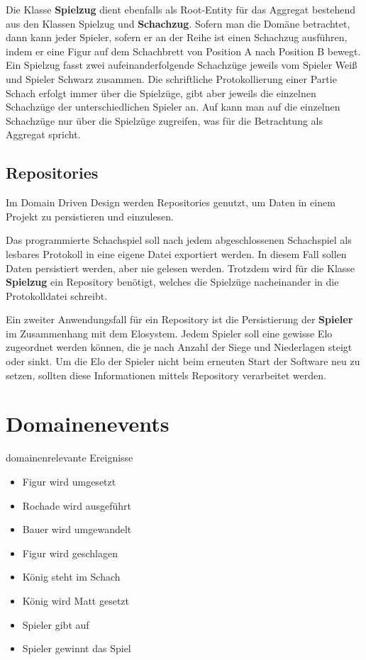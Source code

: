 Die Klasse \textbf{Spielzug} dient ebenfalls als Root-Entity für das Aggregat bestehend aus den Klassen Spielzug und \textbf{Schachzug}.
Sofern man die Domäne betrachtet, dann kann jeder Spieler, sofern er an der Reihe ist einen Schachzug ausführen, indem er eine Figur auf dem Schachbrett von Position A nach Position B bewegt. 
Ein Spielzug fasst zwei aufeinanderfolgende Schachzüge jeweils vom Spieler Weiß und Spieler Schwarz zusammen.
Die schriftliche Protokollierung einer Partie Schach erfolgt immer über die Spielzüge, gibt aber jeweils die einzelnen Schachzüge der unterschiedlichen Spieler an. 
Auf kann man auf die einzelnen Schachzüge nur über die Spielzüge zugreifen, was für die Betrachtung als Aggregat spricht. 

\subsection*{Repositories}

Im Domain Driven Design werden Repositories genutzt, um Daten in einem Projekt zu persistieren und einzulesen. 

Das programmierte Schachspiel soll nach jedem abgeschlossenen Schachspiel als lesbares Protokoll in eine eigene Datei exportiert werden. 
In diesem Fall sollen Daten persistiert werden, aber nie gelesen werden. 
Trotzdem wird für die Klasse \textbf{Spielzug} ein Repository benötigt, welches die Spielzüge nacheinander in die Protokolldatei schreibt. 

Ein zweiter Anwendungsfall für ein Repository ist die Persistierung der \textbf{Spieler} im Zusammenhang mit dem Elosystem. 
Jedem Spieler soll eine gewisse Elo zugeordnet werden können, die je nach Anzahl der Siege und Niederlagen steigt oder sinkt. 
Um die Elo der Spieler nicht beim erneuten Start der Software neu zu setzen, sollten diese Informationen mittels Repository verarbeitet werden. 

\section{Domainenevents}

domainenrelevante Ereignisse

\begin{itemize}
    \item Figur wird umgesetzt
    \item Rochade wird ausgeführt
    \item Bauer wird umgewandelt
    \item Figur wird geschlagen
    \item König steht im Schach
    \item König wird Matt gesetzt
    \item Spieler gibt auf
    \item Spieler gewinnt das Spiel
\end{itemize}